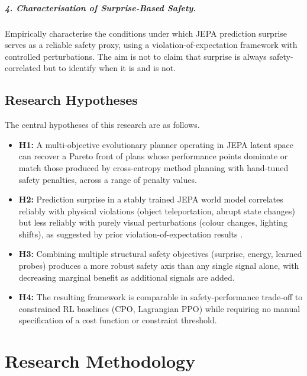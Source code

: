 \documentclass[a4paper,twoside,12pt]{report}
\begin{document}
\paragraph{4. Characterisation of Surprise-Based Safety.} Empirically characterise the conditions under which JEPA prediction surprise serves as a reliable safety proxy, using a violation-of-expectation framework with controlled perturbations. The aim is not to claim that surprise is always safety-correlated but to identify when it is and is not.

\section{Research Hypotheses}

The central hypotheses of this research are as follows.

\begin{itemize}
    \item \textbf{H1:} A multi-objective evolutionary planner operating in JEPA latent space can recover a Pareto front of plans whose performance points dominate or match those produced by cross-entropy method planning with hand-tuned safety penalties, across a range of penalty values.

    \item \textbf{H2:} Prediction surprise in a stably trained JEPA world model correlates reliably with physical violations (object teleportation, abrupt state changes) but less reliably with purely visual perturbations (colour changes, lighting shifts), as suggested by prior violation-of-expectation results \citep{maes2026lewm}.

    \item \textbf{H3:} Combining multiple structural safety objectives (surprise, energy, learned probes) produces a more robust safety axis than any single signal alone, with decreasing marginal benefit as additional signals are added.

    \item \textbf{H4:} The resulting framework is comparable in safety-performance trade-off to constrained RL baselines (CPO, Lagrangian PPO) while requiring no manual specification of a cost function or constraint threshold.
\end{itemize}

\chapter{Research Methodology}\label{ch:methodology}
\end{document}
